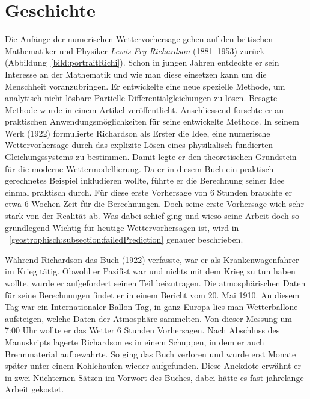 %
%
%
%
\section{Geschichte\label{geostrophisch:section:geschichte}}

Die Anfänge der numerischen Wettervorhersage gehen auf den britischen Mathematiker und Physiker \emph{Lewis Fry Richardson} (1881–1953) zurück (Abbildung~\ref{bild:portraitRichi}).
Schon in jungen Jahren entdeckte er sein Interesse an der Mathematik und wie man diese einsetzen kann um die Menschheit voranzubringen.
Er entwickelte eine neue spezielle Methode, um analytisch nicht lösbare Partielle Differentialgleichungen zu lösen. 
Besagte Methode wurde in einem Artikel veröffentlicht.
Anschliessend forschte er an praktischen Anwendungsmöglichkeiten für seine entwickelte Methode.
In seinem Werk \cite{geostrophisch:wpbnp} (1922) formulierte Richardson als Erster die Idee, eine numerische Wettervorhersage durch das explizite Lösen eines physikalisch fundierten Gleichungssystems zu bestimmen.  
Damit legte er den theoretischen Grundstein für die moderne Wettermodellierung.
Da er in diesem Buch ein praktisch gerechnetes Beispiel inkludieren wollte, führte er die Berechnung seiner Idee einmal praktisch durch.
Für diese erste Vorhersage von 6 Stunden brauchte er etwa 6 Wochen Zeit für die Berechnungen.
Doch seine erste Vorhersage wich sehr stark von der Realität ab.
Was dabei schief ging und wieso seine Arbeit doch so grundlegend Wichtig für heutige Wettervorhersagen ist, wird in ~\ref{geostrophisch:subsection:failedPrediction} genauer beschrieben.

Während Richardson das Buch \cite{geostrophisch:wpbnp} (1922) verfasste, war er als Krankenwagenfahrer im Krieg tätig. 
Obwohl er Pazifist war und nichts mit dem Krieg zu tun haben wollte, wurde er aufgefordert seinen Teil beizutragen. 
Die atmosphärischen Daten für seine Berechnungen findet er in einem Bericht vom 20. Mai 1910. 
An diesem Tag war ein \glqq Internationaler Ballon-Tag\grqq, in ganz Europa lies man Wetterballone aufsteigen, welche Daten der Atmosphäre sammelten.
Von dieser Messung um 7:00 Uhr wollte er das Wetter 6 Stunden Vorhersagen. 
Nach Abschluss des Manuskripts lagerte Richardson es in einem Schuppen, in dem er auch Brennmaterial aufbewahrte.
So ging das Buch verloren und wurde erst Monate später unter einem Kohlehaufen wieder aufgefunden.
Diese Anekdote erwähnt er in zwei Nüchternen Sätzen im Vorwort des Buches, dabei hätte es fast jahrelange Arbeit gekostet. 

